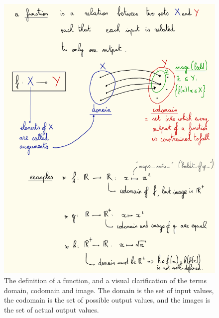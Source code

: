         \begin{figure}[H] \centering
            \includegraphics{images/functions}
            \caption{The definition of a function, and a visual clarification of the terms domain, codomain and image. The domain is the set of input values, the codomain is the set of possible output values, and the images is the set of actual output values.}
            \label{fig:functions}
        \end{figure}

